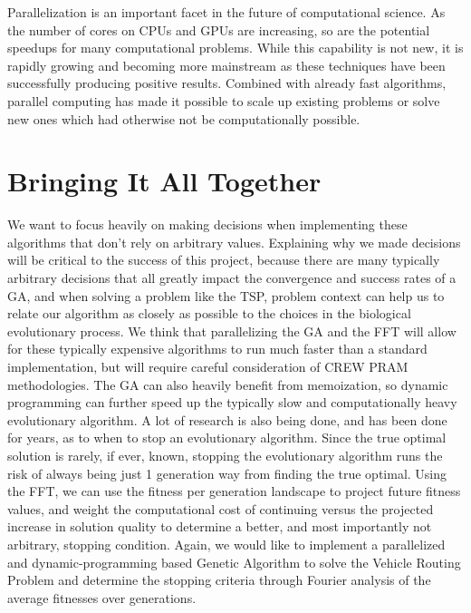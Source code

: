 \documentclass{article}
\renewcommand{\_}{\ifincsname_\else\legacyunderscore\fi}
\begin{document}
Parallelization is an important facet in the future of computational science. As the number of cores on CPUs and GPUs are increasing, so are the potential speedups for many computational problems. While this capability is not new, it is rapidly growing and becoming more mainstream as these techniques have been successfully producing positive results. Combined with already fast algorithms, parallel computing has made it possible to scale up existing problems or solve new ones which had otherwise not be computationally possible. 


\section*{Bringing It All Together}
We want to focus heavily on making decisions when implementing these algorithms that don't rely on arbitrary values. Explaining why we made decisions will be critical to the success of this project, because there are many typically arbitrary decisions that all greatly impact the convergence and success rates of a GA, and when solving a problem like the TSP, problem context can help us to relate our algorithm as closely as possible to the choices in the biological evolutionary process. We think that parallelizing the GA and the FFT will allow for these typically expensive algorithms to run much faster than a standard implementation, but will require careful consideration of CREW PRAM methodologies. The GA can also heavily benefit from memoization, so dynamic programming can further speed up the typically slow and computationally heavy evolutionary algorithm. A lot of research is also being done, and has been done for years, as to when to stop an evolutionary algorithm. Since the true optimal solution is rarely, if ever, known, stopping the evolutionary algorithm runs the risk of always being just 1 generation way from finding the true optimal. Using the FFT, we can use the fitness per generation landscape to project future fitness values, and weight the computational cost of continuing versus the projected increase in solution quality to determine a better, and most importantly not arbitrary, stopping condition. Again, we would like to implement a parallelized and dynamic-programming based Genetic Algorithm to solve the Vehicle Routing Problem and determine the stopping criteria through Fourier analysis of the average fitnesses over generations. 

\pagebreak
\printbibliography
\end{document}
